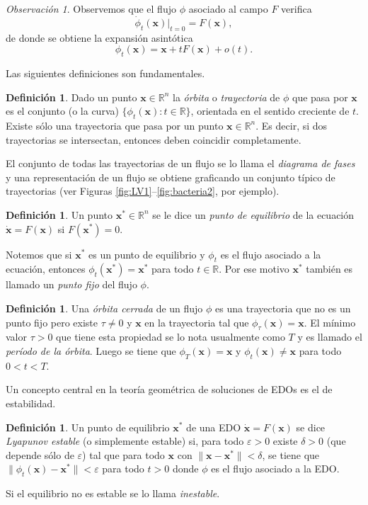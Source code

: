 \documentclass[12pt, a4paper]{amsbook}
\newcommand{\ve}{\varepsilon}
\newcommand{\R}{{\mathbb R}}
\newcommand{\xx}{{\mathbf x}}
\theoremstyle{remark}
\newtheorem{obs}[teo]{Observación}
\theoremstyle{definition}
\newtheorem{defi}[teo]{Definición}
\numberwithin{section}{chapter}
\numberwithin{subsection}{section}
\numberwithin{equation}{section}
\numberwithin{figure}{chapter}
\begin{document}
\begin{obs}
Observemos que el flujo $\phi$ asociado al campo $F$ verifica
$$
\dot \phi_t(\xx)|_{t=0} = F(\xx),
$$
de donde se obtiene la expansión asintótica
$$
\phi_t(\xx) = \xx + tF(\xx) + o(t).
$$
\end{obs}
Las siguientes definiciones son fundamentales.
\begin{defi}
Dado un punto $\xx\in\R^n$ la {\em órbita} o {\em trayectoria} de $\phi$ que pasa por $\xx$ es el conjunto (o la curva) $\{\phi_t(\xx)\colon t\in\R\}$, orientada en el sentido creciente de $t$. Existe sólo una trayectoria que pasa por un punto $\xx\in\R^n$. Es decir, si dos trayectorias se intersectan, entonces deben coincidir completamente.

El conjunto de todas las trayectorias de un flujo se lo llama el {\em diagrama de fases} y una representación de un flujo se obtiene graficando un conjunto típico de trayectorias (ver Figuras \ref{fig:LV1}--\ref{fig:bacteria2}, por ejemplo).
\end{defi}

\begin{defi}
Un punto $\xx^*\in\R^n$ se le dice un {\em punto de equilibrio} de la ecuación $\dot\xx = F(\xx)$ si $F(\xx^*)=0$.
\end{defi}

Notemos que si $\xx^*$ es un punto de equilibrio y $\phi_t$ es el flujo asociado a la ecuación, entonces $\phi_t(\xx^*)=\xx^*$ para todo $t\in\R$. Por ese motivo $\xx^*$ también es llamado un {\em punto fijo} del flujo $\phi$.


\begin{defi}
Una {\em órbita cerrada} de un flujo $\phi$ es una trayectoria que no es un punto fijo pero existe $\tau\neq 0$ y $\xx$ en la trayectoria tal que $\phi_\tau(\xx)=\xx$. El mínimo valor $\tau>0$ que tiene esta propiedad se lo nota usualmente como $T$ y es llamado el {\em período de la órbita}. Luego se tiene que $\phi_T(\xx)=\xx$ y $\phi_t(\xx)\neq\xx$ para todo $0<t<T$.
\end{defi}

Un concepto central en la teoría geométrica de soluciones de EDOs es el de estabilidad.
\begin{defi}
Un punto de equilibrio $\xx^*$ de una EDO $\dot\xx = F(\xx)$ se dice {\em Lyapunov estable} (o simplemente estable) si, para todo $\ve>0$ existe $\delta>0$ (que depende sólo de $\ve$) tal que para todo $\xx$ con $\|\xx - \xx^*\|<\delta$, se tiene que $\|\phi_t(\xx)-\xx^*\|<\ve$ para todo $t>0$ donde $\phi$ es el flujo asociado a la EDO.

Si el equilibrio no es estable se lo llama {\em inestable}.
\end{defi}
\end{document}
